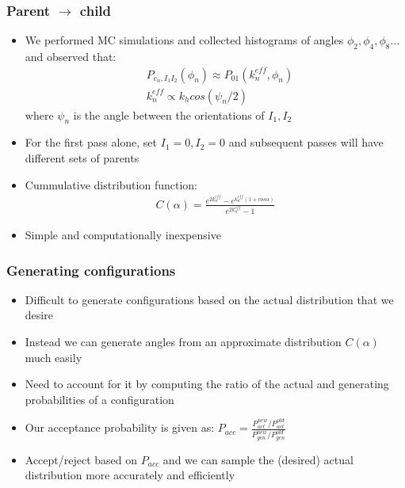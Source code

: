 \documentclass[xcolor=svgnames]{beamer}
\begin{document}
	\begin{frame}
	\frametitle{Parent $\to$ child}
	\begin{itemize}%
	\item We performed MC simulations and collected histograms of angles $\phi_2 , \phi_4, \phi_8 \ldots$ and observed that:
	\begin{align*}
	&P_{c_n,I_1 I_2} (\phi_n) \approx P_{01} (k_n^{eff},\phi_n) \\
	&k_n^{eff} \propto k_h cos(\psi_n/2)
	\end{align*}
	where $\psi_n$ is the angle between the orientations of $I_1 , I_2$
	\item For the first pass alone, set $I_1 = 0, I_2 = 0$ and subsequent passes will have different sets of parents
	\item Cummulative distribution function:
	\begin{align}
	C(\alpha) = \frac{e^{2k_n^{eff}} - e^{k_n^{eff} (1 + cos \alpha)}}{e^{2k_n^{eff}} - 1}
	\end{align}
	\item Simple and \alert{computationally inexpensive}
	\end{itemize}
	\end{frame}

	\begin{frame}
	\frametitle{Generating configurations}
	\begin{itemize}
	\item Difficult to generate configurations based on the actual distribution that we desire
	\item Instead we can generate angles from an approximate distribution $C(\alpha)$ much easily
	\item Need to account for it by computing the ratio of the actual and generating probabilities of a configuration
	\item Our acceptance probability is given as: $P_{acc} = \frac{P_{act}^{new}/P_{act}^{old}}{P_{gen}^{new}/P_{gen}^{old}}$
	\item Accept/reject based on $P_{acc}$ and we can sample the (desired) actual distribution more \alert{accurately and efficiently}
	\end{itemize}
	\end{frame}
	
\end{document}
